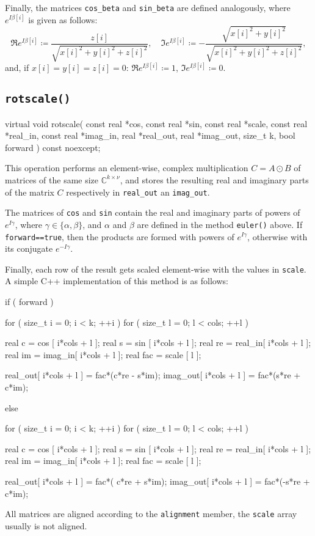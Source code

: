 \documentclass{scrbook}
\newcommand{\complex}{\mathbb{C}}
\begin{document}
Finally, the matrices \lstinline|cos_beta| and \lstinline|sin_beta| are defined
analogously, where $e^{I\beta[i]}$ is given as follows:
\begin{equation*}
\Re e^{I\beta[i]} \coloneqq  \frac{z[i]}{\sqrt{x[i]^2+y[i]^2+z[i]^2}},\quad
\Im e^{I\beta[i]} \coloneqq
-\frac{\sqrt{x[i]^2+y[i]^2}}{\sqrt{x[i]^2+y[i]^2+z[i]^2}},
\end{equation*}
and, if $x[i]=y[i]=z[i]=0$: $\Re e^{I\beta[i]}\coloneqq 1$,
$\Im e^{I\beta[i]}\coloneqq 0$.


\subsection{\texorpdfstring{\lstinline|rotscale()|}{rotscale}}
\begin{cppcode*}
virtual void rotscale( const real *cos,      const real *sin, const real *scale,
                       const real *real_in,  const real *imag_in,
                             real *real_out,       real *imag_out,
                       size_t k, bool forward ) const noexcept;
\end{cppcode*}

This operation performs an element-wise, complex multiplication $C=A\odot B$ of
matrices of the same size $\complex^{k\times\nu}$, and stores the resulting
real and imaginary parts of the matrix $C$ respectively in \lstinline|real_out|
an \lstinline|imag_out|.

The matrices of \lstinline|cos| and \lstinline|sin| contain the real and
imaginary parts of powers of $e^{I\gamma}$, where
$\gamma\in\lbrace\alpha,\beta\rbrace$, and $\alpha$ and $\beta$ are defined
in the method \lstinline|euler()| above. If \lstinline|forward==true|, then
the products are formed with powers of $e^{I\gamma}$, otherwise with its
conjugate $e^{-I\gamma}$.

Finally, each row of the result gets scaled element-wise with the values
in \lstinline|scale|. A simple C++ implementation of this method is as follows:
\begin{cppcode*}
if ( forward )
{
    for ( size_t i = 0; i < k;    ++i )
    for ( size_t l = 0; l < cols; ++l )
    {
        real c   = cos    [ i*cols + l ];
        real s   = sin    [ i*cols + l ];
        real re  = real_in[ i*cols + l ];
        real im  = imag_in[ i*cols + l ];
        real fac = scale  [          l ];
        
        real_out[ i*cols + l ] = fac*(c*re - s*im);
        imag_out[ i*cols + l ] = fac*(s*re + c*im);
    }
}
else
{
    for ( size_t i = 0; i < k;    ++i )
    for ( size_t l = 0; l < cols; ++l )
    {
        real c   = cos    [ i*cols + l ];
        real s   = sin    [ i*cols + l ];
        real re  = real_in[ i*cols + l ];
        real im  = imag_in[ i*cols + l ];
        real fac = scale  [          l ];
        
        real_out[ i*cols + l ] = fac*( c*re + s*im);
        imag_out[ i*cols + l ] = fac*(-s*re + c*im);
    }
}
\end{cppcode*}
All matrices are aligned according to the \lstinline|alignment| member,
the \lstinline|scale| array usually is not aligned.
\end{document}
